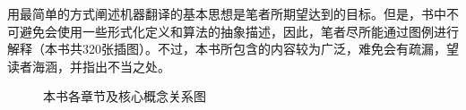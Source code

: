 \begin{spacing}{1.18}
{\red 用最简单的方式阐述机器翻译的基本思想}是笔者所期望达到的目标。但是，书中不可避免会使用一些形式化定义和算法的抽象描述，因此，笔者尽所能通过图例进行解释（本书共320张插图）。不过，本书所包含的内容较为广泛，难免会有疏漏，望读者海涵，并指出不当之处。

\begin{figure}[htp]
\centering
\centering

\caption{本书各章节及核心概念关系图}
\label{fig:preface}
\end{figure}

\end{spacing}








